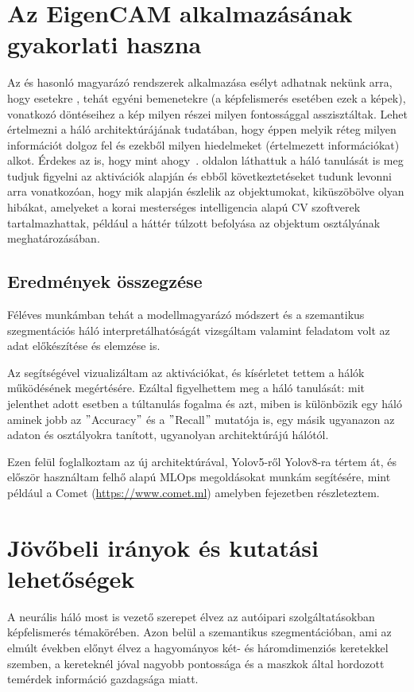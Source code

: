 \documentclass[12pt,oneside,a4paper]{article}
\newcommand{\newsection}[1]{\clearpage\section{#1}}\label{makro}
\theoremstyle{remark}
\begin{document}
	\newsection{Az EigenCAM alkalmazásának gyakorlati haszna}\label{sec:az-eigencam-alkalmazasanak-gyakorlati-haszna}
	Az  és hasonló magyarázó rendszerek alkalmazása esélyt adhatnak nekünk arra, hogy esetekre
	, tehát egyéni bemenetekre (a képfelismerés esetében ezek a képek), vonatkozó döntéseihez a kép milyen részei
	milyen fontossággal asszisztáltak.
	Lehet értelmezni a háló architektúrájának tudatában, hogy éppen melyik réteg milyen információt dolgoz fel
	és ezekből milyen hiedelmeket (értelmezett információkat) alkot.
	Érdekes az is, hogy mint ahogy~\pageref{subsec:magyarazat}. oldalon láthattuk a háló tanulását is meg tudjuk
	figyelni az aktivációk alapján és ebből következtetéseket tudunk levonni arra vonatkozóan, hogy mik alapján észlelik
	az objektumokat, kiküszöbölve olyan hibákat, amelyeket a korai mesterséges intelligencia  alapú
	\ac{CV} szoftverek tartalmazhattak, például a háttér túlzott befolyása az objektum osztályának meghatározásában.
	
	\subsection{Eredmények összegzése}\label{subsec:osszegzes-es-kovetkeztetes}
	Féléves munkámban tehát a  modellmagyarázó módszert és a 
	szemantikus szegmentációs háló interpretálhatóságát vizsgáltam valamint feladatom volt az adat előkészítése és elemzése is.
	
	Az  segítségével vizualizáltam az aktivációkat, és kísérletet tettem a hálók működésének megértésére.
	Ezáltal figyelhettem meg a háló tanulását: mit jelenthet adott esetben a túltanulás fogalma és azt, miben is
	különbözik egy háló aminek jobb az \("\)Accuracy\("\) és a \("\)Recall\("\) mutatója is, egy másik ugyanazon az adaton és
	osztályokra tanított, ugyanolyan architektúrájú hálótól.
	
	Ezen felül foglalkoztam az új architektúrával, Yolov5-ről Yolov8-ra tértem át, és először használtam felhő alapú
	MLOps megoldásokat munkám segítésére, mint például a Comet (\url{https://www.comet.ml}) amelyben  fejezetben
	részleteztem.
	
	\newsection{Jövőbeli irányok és kutatási lehetőségek}\label{sec:jovobeli-iranyok-es-kutatasi-lehetosegek}
	A  neurális háló most is vezető szerepet élvez az autóipari szolgáltatásokban képfelismerés
	témakörében.
	Azon belül a szemantikus szegmentációban, ami az elmúlt években előnyt élvez
	a hagyományos  két- és háromdimenziós keretekkel szemben, a kereteknél jóval nagyobb pontossága
	és a maszkok által hordozott temérdek információ gazdagsága miatt.
	
\end{document}
